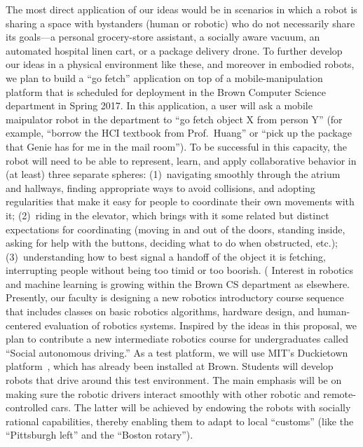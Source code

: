 The most direct application of our ideas would be in scenarios in
which a robot is sharing a space with bystanders (human or robotic)
who do not necessarily share its goals---a personal grocery-store
assistant, a socially aware vacuum, an automated hospital linen cart, or
a package delivery drone.  To further develop our ideas in a physical
environment like these, and moreover in embodied robots,
we plan to build a ``go fetch'' application on top of a
mobile-manipulation platform that is scheduled for deployment in the
Brown Computer Science department in Spring 2017.  In this
application, a user will ask a mobile maipulator robot in the
department to ``go fetch object X from person Y'' (for example,
``borrow the HCI textbook from Prof.\ Huang'' or ``pick up the package
that Genie has for me in the mail room'').  To be successful in this
capacity, the robot will need to be able to represent, learn, and
apply collaborative behavior in (at least) three separate spheres:
%
(1)~navigating smoothly through the atrium and hallways, finding
  appropriate ways to avoid collisions, and adopting regularities that
  make it easy for people to coordinate their own movements with it;
%
(2)~riding in the elevator, which brings with it some related but
  distinct expectations for coordinating (moving in and out of the
  doors, standing inside, asking for help with the buttons, deciding
  what to do when obstructed, etc.);
%
(3)~understanding how to best signal a handoff of the object it is
  fetching, interrupting people without being too timid or too
  boorish.
%
(
Interest in robotics and machine learning is growing within the Brown
CS department as elsewhere.  Presently, our faculty is designing a new
robotics introductory course sequence that includes classes on basic
robotics algorithms, hardware design, and human-centered evaluation of
robotics systems.  Inspired by the ideas in this proposal, we plan to
contribute a new intermediate robotics course for undergraduates
called ``Social autonomous driving.''  As a test platform, we will use
MIT's Duckietown platform~\cite{paull16},
which has already been installed at Brown.  Students will develop
robots that drive around this test environment.  The main emphasis
will be on making sure the robotic drivers interact smoothly with
other robotic and remote-controlled cars.  The latter will be achieved
by endowing the robots with socially rational capabilities, thereby
enabling them to adapt to local ``customs'' 
(like the ``Pittsburgh left'' and the ``Boston rotary'').

